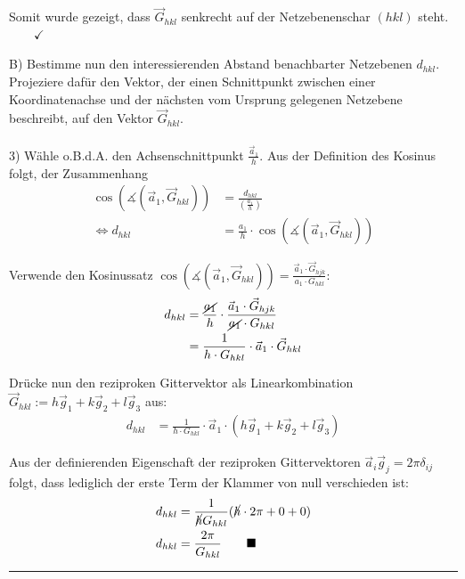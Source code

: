 \documentclass{article}
\newcommand{\lr}[1]{\left(#1\right)}
\begin{document}
{	Somit wurde gezeigt, dass $\vec{G}_{hkl}$ senkrecht auf der Netzebenenschar $(hkl)$ steht. $\qquad \checkmark$
	

\newpage


	B) Bestimme nun den interessierenden Abstand benachbarter Netzebenen $d_{hkl}$. Projeziere dafür den Vektor, der einen Schnittpunkt zwischen einer Koordinatenachse und der nächsten vom Ursprung gelegenen Netzebene beschreibt, auf den Vektor $\vec{G}_{hkl}$.\\
	\\
	3) Wähle o.B.d.A. den Achsenschnittpunkt $\frac{\vec{a}_1}{h}$. Aus der Definition des Kosinus folgt, der Zusammenhang
		\begin{align*}
			\cos\lr{ \measuredangle( \vec{a}_1, \vec{G}_{hkl} ) } &= \frac{d_{hkl}}{\lr{ \frac{a_1}{h} }} \\
			\Leftrightarrow d_{hkl} &= \frac{a_1}{h} \cdot \cos\lr{ \measuredangle ( \vec{a}_1, \vec{G}_{hkl} ) }
		\end{align*}
	
	Verwende den Kosinussatz $\cos\lr{ \measuredangle ( \vec{a}_1, \vec{G}_{hkl} ) } = \frac{\vec{a}_1 \cdot \vec{G}_{hjk}}{a_1 \cdot G_{hkl}}$:
		\begin{align*}
			d_{hkl} &= \frac{ \cancel{a_1}}{h} \cdot \frac{\vec{a}_1 \cdot \vec{G}_{hjk}}{ \cancel{a_1} \cdot G_{hkl} } \\
			&= \frac{1}{h \cdot G_{hkl}} \cdot \vec{a}_1 \cdot \vec{G}_{hkl}
		\end{align*}
	
	Drücke nun den reziproken Gittervektor als Linearkombination $\vec{G}_{hkl} := h \vec{g}_1 + k \vec{g}_2 + l \vec{g}_3$ aus:
		\begin{align*}
			d_{hkl} &= \frac{1}{h \cdot G_{hkl}} \cdot \vec{a}_1 \cdot ( h \vec{g}_1 + k \vec{g}_2 + l \vec{g}_3 )
		\end{align*}
	
	Aus der definierenden Eigenschaft der reziproken Gittervektoren $\vec{a}_i \vec{g}_j = 2\pi \delta_{ij}$ folgt, dass lediglich der erste Term der Klammer von null verschieden ist:
		\begin{align*}
			d_{hkl} &= \frac{1}{ \cancel{h} G_{hkl}} ( \cancel{h} \cdot 2\pi + 0 + 0 ) \\
			d_{hkl} &= \frac{2\pi}{G_{hkl}} \qquad \blacksquare
		\end{align*}
\hrule
}


\newpage
\end{document}

